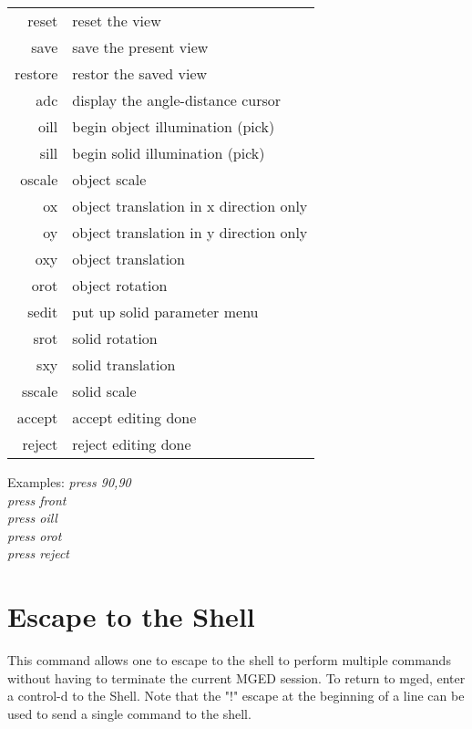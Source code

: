 \begin{tabular}{rl}
       reset         &  reset the view \\
       save          &  save the present view \\
       restore       &  restor the saved view \\
       adc           & display the angle-distance cursor \\
       oill          &  begin object illumination (pick) \\
       sill          & begin solid illumination (pick) \\
       oscale        & object scale \\
       ox            & object translation in x direction only \\
       oy            & object translation in y direction only \\
       oxy           & object translation \\
       orot          & object rotation \\
       sedit         & put up solid parameter menu \\
       srot          & solid rotation \\
       sxy           & solid translation \\
       sscale        & solid scale \\
       accept        & accept editing done \\
       reject        & reject editing done \\
\end{tabular}

Examples:
{\em
         press 90,90 \\
         press front \\
         press oill \\
         press orot \\
         press reject \\
}

\section{Escape to the Shell}

{\em\center
%
}

This command allows one to escape to the shell to perform multiple commands
without having to terminate the current MGED session.
To return to mged, enter a control-d to the Shell.
Note that the "!" escape at the beginning of a line can be used
to send a single command to the shell.

